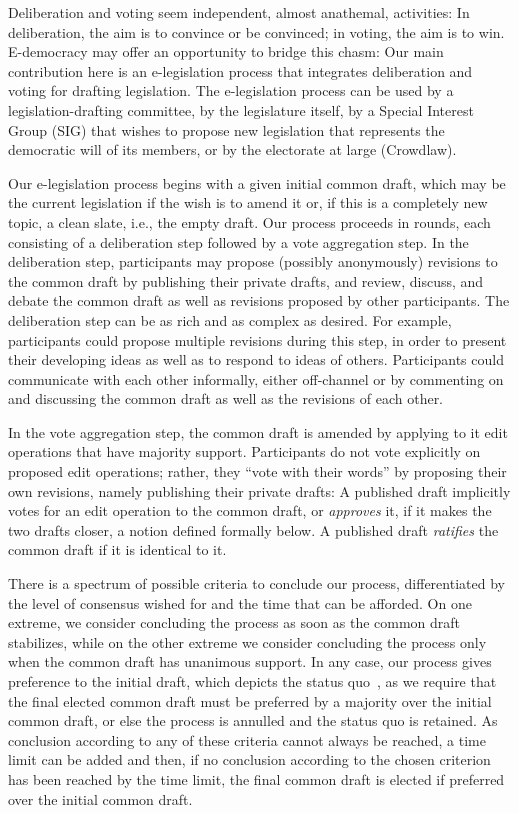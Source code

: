 \documentclass[sigconf]{aamas}  %
\begin{document}
Deliberation and voting seem independent, almost anathemal, activities: In deliberation, the aim is to convince or be convinced; in voting, the aim is to win.  E-democracy may offer an opportunity to bridge this chasm: Our main contribution here is an e-legislation process that integrates deliberation and voting for drafting legislation. The e-legislation process can be used by a legislation-drafting committee, by the legislature itself, by a Special Interest Group (SIG) that wishes to propose new legislation that represents the democratic will of its members, or by the electorate at large (Crowdlaw).

Our e-legislation process begins with a given initial common draft, which may be the current legislation if the wish is to amend it or, if this is a completely new topic, a clean slate, i.e., the empty draft.  Our process proceeds in rounds, each consisting of a deliberation step followed by a vote aggregation step. In the deliberation step,
participants may propose (possibly anonymously) revisions to the common draft by publishing their private drafts,  and review, discuss, and debate the common draft as well as revisions proposed by other participants. The deliberation step can be as rich and as complex as desired. For example, participants could propose multiple revisions during this step, in order to present their developing ideas as well as to respond to ideas of others. Participants could communicate with each other informally, either off-channel or by commenting on and discussing the common draft as well as the revisions of each other. 

In the vote aggregation step, the common draft is amended by applying to it edit operations that have majority support. Participants do not vote explicitly on proposed edit operations; rather, they ``vote with their words'' by proposing their own revisions, namely publishing their private drafts:  A published draft implicitly votes for an edit operation to the common draft, or \emph{approves} it, if it makes the two drafts closer, a notion defined formally below.  A published draft \emph{ratifies} the common draft if it is identical to it.

There is a spectrum of possible criteria to conclude our process, differentiated by the level of consensus wished for and the time that can be afforded. On one extreme, we consider concluding the process as soon as the common draft stabilizes, while on the other extreme we consider concluding the process only when the common draft has unanimous support. In any case, our process gives preference to the initial draft, which depicts the status quo~\cite{realsoc}, as we require that the final elected common draft must be preferred by a majority over the initial common draft, or else the process is annulled and the status quo is retained.
As conclusion according to any of these criteria cannot always be reached, a time limit can be added and then, if no conclusion according to the chosen criterion has been reached by the time limit, the final common draft is elected if preferred over the initial common draft.
\end{document}
